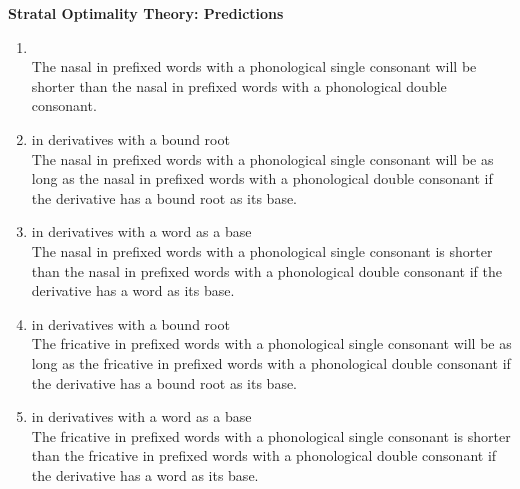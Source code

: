 \textbf{Stratal Optimality Theory: Predictions}

\begin{enumerate}
	
	\item {}  \\
	The nasal in prefixed words with a phonological single consonant will be shorter than the nasal in  prefixed words with a phonological double consonant. 
		
	\item{}  in derivatives with a bound root\\
	 The nasal in prefixed words with a phonological single consonant will be as long as the nasal in  prefixed words with a phonological double consonant if  the derivative has a bound root as its base.

	\item {}  in derivatives with a word as a base \\
	The nasal in prefixed words with a phonological single consonant is shorter than the nasal in prefixed words with a phonological double consonant if  the derivative has a word as its base.



	
	\item {}  in derivatives with a bound root\\
	The fricative in prefixed words with a phonological single consonant will be as long as the fricative in prefixed words with a phonological double consonant if  the derivative has a bound root as its base.

	\item {}  in derivatives with a word as a base \\
	The fricative in prefixed words with a phonological single consonant is shorter than the fricative in prefixed words with a phonological double consonant if  the derivative has a word as its base.


\end{enumerate}
